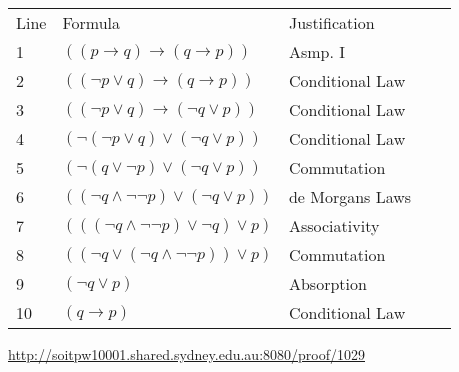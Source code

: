 \documentclass{standalone}
\begin{document}
\begin{tabular}{lllll}
    Line & Formula & Justification \\
    1 & $((p\rightarrow q)\rightarrow (q\rightarrow p))$  & Asmp. I \\
    2 & $((\neg p\lor q)\rightarrow (q\rightarrow p))$  & Conditional Law \\
    3 & $((\neg p\lor q)\rightarrow (\neg q\lor p))$  & Conditional Law \\
    4 & $(\neg (\neg p\lor q)\lor (\neg q\lor p))$  & Conditional Law \\
    5 & $(\neg (q\lor \neg p)\lor (\neg q\lor p))$  & Commutation \\
    6 & $((\neg q\land \neg \neg p)\lor (\neg q\lor p))$  & de Morgans Laws \\
    7 & $(((\neg q\land \neg \neg p)\lor \neg q)\lor p)$  & Associativity \\
    8 & $((\neg q\lor (\neg q\land \neg \neg p))\lor p)$  & Commutation \\
    9 & $(\neg q\lor p)$  & Absorption \\
    10 & $(q\rightarrow p)$  & Conditional Law \\
\end{tabular}

\url{http://soitpw10001.shared.sydney.edu.au:8080/proof/1029}
\end{document}
